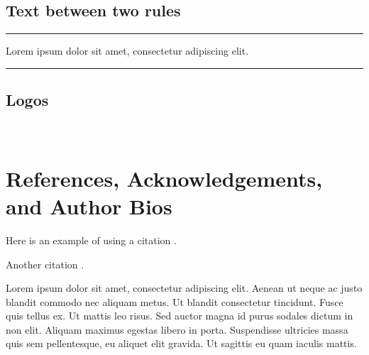 \documentclass{csmagazine}
\begin{document}
\subsection{Text between two rules}

\noindent\rule{\textwidth}{1pt}
Lorem ipsum dolor sit amet, consectetur adipiscing elit.
\noindent\rule{\textwidth}{1pt}




\subsection{Logos}

\AllTeX ~ \BibLaTeX

\section{References, Acknowledgements, and Author Bios}

Here is an example of using a citation .

Another citation .


Lorem ipsum dolor sit amet, consectetur adipiscing elit. Aenean ut neque ac justo blandit commodo nec aliquam metus. Ut blandit consectetur tincidunt. Fusce quis tellus ex. Ut mattis leo risus. Sed auctor magna id purus sodales dictum in non elit. Aliquam maximus egestas libero in porta. Suspendisse ultricies massa quis sem pellentesque, eu aliquet elit gravida. Ut sagittis eu quam iaculis mattis.






\printbibliography[heading=none]




\end{document}
